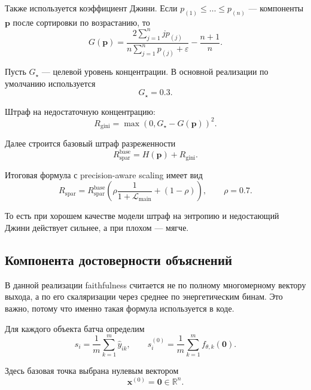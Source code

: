 \documentclass[11pt]{article}
\begin{document}
Также используется коэффициент Джини. Если $p_{(1)} \le \dots \le p_{(n)}$ --- компоненты $\mathbf{p}$ после сортировки по возрастанию, то
\begin{equation}
G(\mathbf{p}) = \frac{2 \sum_{j=1}^{n} j p_{(j)}}{n \sum_{j=1}^{n} p_{(j)} + \varepsilon} - \frac{n+1}{n}.
\end{equation}

Пусть $G_{\star}$ --- целевой уровень концентрации. В основной реализации по умолчанию используется
\begin{equation}
G_{\star} = 0.3.
\end{equation}

Штраф на недостаточную концентрацию:
\begin{equation}
R_{\mathrm{gini}} = \max(0, G_{\star} - G(\mathbf{p}))^2.
\end{equation}

Далее строится базовый штраф разреженности
\begin{equation}
R_{\mathrm{spar}}^{\mathrm{base}} = H(\mathbf{p}) + R_{\mathrm{gini}}.
\end{equation}

Итоговая формула с precision-aware scaling имеет вид
\begin{equation}
R_{\mathrm{spar}} = R_{\mathrm{spar}}^{\mathrm{base}}
\left(
\rho \frac{1}{1 + \mathcal{L}_{\mathrm{main}}} + (1-\rho)
\right),
\qquad
\rho = 0.7.
\end{equation}

То есть при хорошем качестве модели штраф на энтропию и недостающий Джини действует сильнее, а при плохом --- мягче.

\subsection{Компонента достоверности объяснений}

В данной реализации faithfulness считается не по полному многомерному вектору выхода, а по его скаляризации через среднее по энергетическим бинам. Это важно, потому что именно такая формула используется в коде.

Для каждого объекта батча определим
\begin{equation}
 s_i = \frac{1}{m} \sum_{k=1}^{m} \hat{y}_{ik},
 \qquad
 s_i^{(0)} = \frac{1}{m} \sum_{k=1}^{m} f_{\theta,k}(\mathbf{0}).
\end{equation}

Здесь базовая точка выбрана нулевым вектором
\begin{equation}
\mathbf{x}^{(0)} = \mathbf{0} \in \mathbb{R}^n.
\end{equation}
\end{document}
